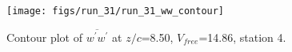 \begin{figure}[H]
\centering
\texttt{[image: figs/run\_31/run\_31\_ww\_contour]}
\caption{Contour plot of $\overline{w^\prime w^\prime}$ at $z/c$=8.50, $V_{free}$=14.86, station 4.}
\label{fig:run_31_ww_contour}
\end{figure}


